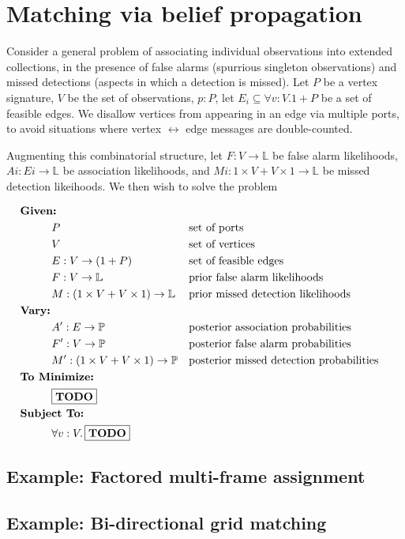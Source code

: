 \documentclass{article}
\newcommand \TODO {\fbox{\textbf{TODO}}}
\newcommand \Like {{\mathbb{L}}}
\newcommand \Prob {{\mathbb{P}}}
\begin{document}
\section{Matching via belief propagation}

Consider a general problem of associating individual observations into
extended collections,
in the presence of false alarms (spurrious singleton observations)
and missed detections (aspects in which a detection is missed).
Let $P$ be a vertex signature,
$V$ be the set of observations,
$p:P$,
let $E_i \subseteq \forall v:V. 1+P$ be a set of feasible edges.
We disallow vertices from appearing in an edge via multiple ports,
to avoid situations where vertex $\leftrightarrow$ edge messages are double-counted.

Augmenting this combinatorial structure,
let $F:V \to \Like$ be false alarm likelihoods,
$Ai : Ei \to \Like$ be association likelihoods, and
$Mi : 1 \times V + V \times 1 \to \Like$ be missed detection likeihoods.
We then wish to solve the problem

\newcommand \tab {\hspace{1cm}}

\begin{align*}
&\textbf{Given:}
\\&\tab P                     &&\text{set of ports}
\\&\tab V                     &&\text{set of vertices}
\\&\tab E : V \to (1 + P)     &&\text{set of feasible edges}
\\&\tab F : V \to \Like       &&\text{prior false alarm likelihoods}
\\&\tab M : ( 1 \times V
            + V \times 1 )
            \to \Like         &&\text{prior missed detection likelihoods}
\\&\textbf{Vary:}
\\&\tab A' : E \to \Prob      &&\text{posterior association probabilities}
\\&\tab F' : V \to \Prob      &&\text{posterior false alarm probabilities}
\\&\tab M' : ( 1 \times V
             + V \times 1 )
             \to \Prob        &&\text{posterior missed detection probabilities}
\\&\textbf{To Minimize:}
\\&\tab \TODO
\\&\textbf{Subject To:}
\\&\tab \forall v:V.\, \TODO
\end{align*}

\subsection{Example: Factored multi-frame assignment}

\subsection{Example: Bi-directional grid matching}
\end{document}

